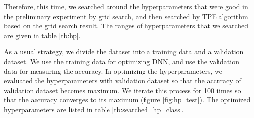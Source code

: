 \documentclass[useamsfonts]{pasj01}
\begin{document}
Therefore, this time, we searched around the hyperparameters that were good in the preliminary experiment by grid search, and then searched by TPE algorithm based 
on the grid search result.
The ranges of hyperparameters that we searched are given in table \ref{tb:hp}.

As a usual strategy, we divide the dataset into a training data and a validation dataset.
We use the training data for optimizing DNN, and use the validation data for measuring the accuracy.
In optimizing the hyperparameters, we evaluated the hyperparameters with validation dataset so
that the accuracy of validation dataset becomes maximum.
We iterate this process for 100 times so that the accuracy converges to its maximum (figure \ref{fig:hp_test}).
The optimized hyperparameters are listed in table \ref{tb:searched_hp_class}.

%
\begin{table}[htbp]
  \label{tb:hp}
\end{table}
\end{document}
